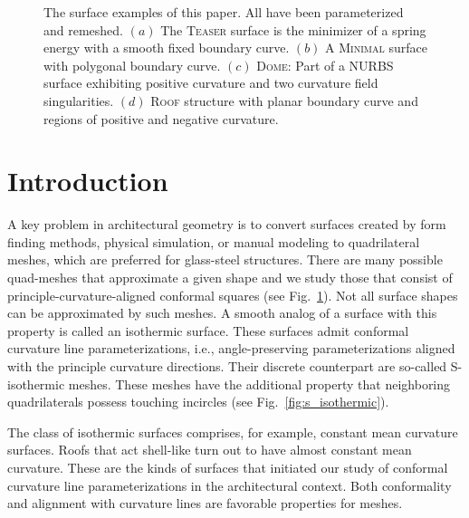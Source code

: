\documentclass[twoside]{article}
\begin{document}
\begin{figure}[ht] 
\centering
\resizebox{\linewidth}{!}{}
\caption{The surface examples of this paper. All have been parameterized and
remeshed. $(a)$ The \textsc{Teaser} surface is the minimizer of a spring energy
with a smooth fixed boundary curve. $(b)$ A \textsc{Minimal} surface with
polygonal boundary curve. $(c)$ \textsc{Dome}: Part of a NURBS surface
exhibiting positive curvature and two curvature field singularities. $(d)$
\textsc{Roof} structure with planar boundary curve and regions of positive and
negative curvature.} 
\label{fig:all_mesh}
\end{figure}

\section{Introduction}

A key problem in architectural geometry is to convert surfaces created by form
finding methods, physical simulation, or manual modeling to quadrilateral
meshes, which are preferred for glass-steel structures. There are many 
possible quad-meshes that approximate a given shape and we study those that consist
of principle-curvature-aligned conformal squares (see Fig.~\ref{fig:all_mesh}). 
Not all surface shapes can be approximated by such meshes. A smooth analog of
a surface with this property is called an isothermic surface. These surfaces admit conformal
curvature line parameterizations, i.e., angle-preserving parameterizations
aligned with the principle curvature directions. Their discrete counterpart are 
so-called S-isothermic meshes. These meshes have the additional property that
neighboring quadrilaterals possess touching incircles (see
Fig.~\ref{fig:s_isothermic}).  

The class of isothermic surfaces comprises, for example, constant mean
curvature surfaces. Roofs that act shell-like turn out to have almost constant
mean curvature. These are the kinds of surfaces that initiated our study of
conformal curvature line parameterizations in the architectural context. Both
conformality and alignment with curvature lines are favorable
properties for meshes. 

\end{document}
